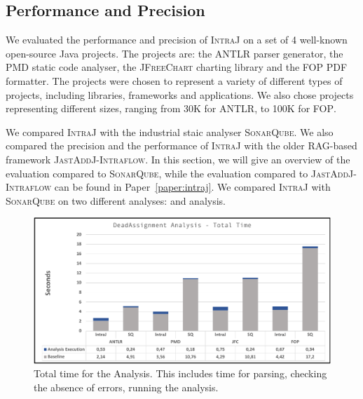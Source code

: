 \subsection{Performance and Precision}
\label{sec:performanceandprecision}
We evaluated the performance and precision of \textsc{IntraJ} on a set of 4 well-known
open-source Java projects.
The projects are: the \textsc{ANTLR} parser generator, the \textsc{PMD} static code analyser,
the \textsc{JFreeChart} charting library and the \textsc{FOP} PDF formatter.
The projects were chosen to represent a variety of different types of projects, including
libraries, frameworks and applications. We also chose projects representing
different sizes, ranging from 30K for \textsc{ANTLR}, to 100K for \textsc{FOP}.


We compared \textsc{IntraJ} with the industrial staic analyser \textsc{SonarQube}.
We also compared the precision and the performance of \textsc{IntraJ} with the
older RAG-based framework \textsc{JastAddJ-Intraflow}.
In this section, we will give an overview of the evaluation compared to \textsc{SonarQube},
while the evaluation compared to \textsc{JastAddJ-Intraflow} can be found in Paper~\ref{paper:intraj}.
We compared \textsc{IntraJ} with \textsc{SonarQube} on two different analyses: 
and  analysis.



\begin{figure}[H]
  \includegraphics[width=1\linewidth]{kappa/img/DAATotalTime.pdf}
  \caption{\label{fig:DAATotalTime}Total time for the  Analysis. This includes time for parsing,
  checking the absence of errors, running the analysis.}
\end{figure}


